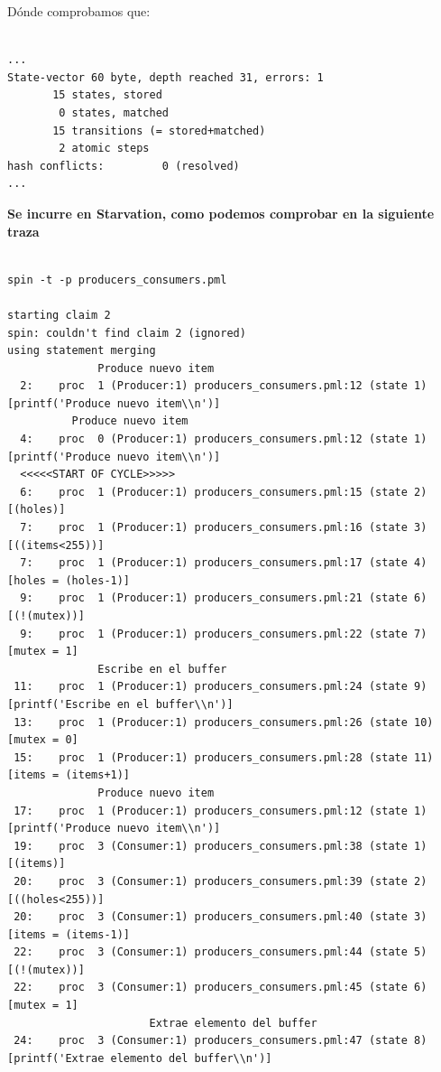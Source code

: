 \documentclass[a4paper,12pt]{article}
\begin{document}
Dónde comprobamos que:

\begin{lstlisting}[frame=single]  % Start your code-block

...
State-vector 60 byte, depth reached 31, errors: 1
       15 states, stored
        0 states, matched
       15 transitions (= stored+matched)
        2 atomic steps
hash conflicts:         0 (resolved)
...
\end{lstlisting}
\textbf{Se incurre en Starvation, como podemos comprobar en la siguiente traza}

\begin{lstlisting}[frame=single]  % Start your code-block

spin -t -p producers_consumers.pml

starting claim 2
spin: couldn't find claim 2 (ignored)
using statement merging
              Produce nuevo item
  2:	proc  1 (Producer:1) producers_consumers.pml:12 (state 1)	[printf('Produce nuevo item\\n')]
          Produce nuevo item
  4:	proc  0 (Producer:1) producers_consumers.pml:12 (state 1)	[printf('Produce nuevo item\\n')]
  <<<<<START OF CYCLE>>>>>
  6:	proc  1 (Producer:1) producers_consumers.pml:15 (state 2)	[(holes)]
  7:	proc  1 (Producer:1) producers_consumers.pml:16 (state 3)	[((items<255))]
  7:	proc  1 (Producer:1) producers_consumers.pml:17 (state 4)	[holes = (holes-1)]
  9:	proc  1 (Producer:1) producers_consumers.pml:21 (state 6)	[(!(mutex))]
  9:	proc  1 (Producer:1) producers_consumers.pml:22 (state 7)	[mutex = 1]
              Escribe en el buffer
 11:	proc  1 (Producer:1) producers_consumers.pml:24 (state 9)	[printf('Escribe en el buffer\\n')]
 13:	proc  1 (Producer:1) producers_consumers.pml:26 (state 10)	[mutex = 0]
 15:	proc  1 (Producer:1) producers_consumers.pml:28 (state 11)	[items = (items+1)]
              Produce nuevo item
 17:	proc  1 (Producer:1) producers_consumers.pml:12 (state 1)	[printf('Produce nuevo item\\n')]
 19:	proc  3 (Consumer:1) producers_consumers.pml:38 (state 1)	[(items)]
 20:	proc  3 (Consumer:1) producers_consumers.pml:39 (state 2)	[((holes<255))]
 20:	proc  3 (Consumer:1) producers_consumers.pml:40 (state 3)	[items = (items-1)]
 22:	proc  3 (Consumer:1) producers_consumers.pml:44 (state 5)	[(!(mutex))]
 22:	proc  3 (Consumer:1) producers_consumers.pml:45 (state 6)	[mutex = 1]
                      Extrae elemento del buffer
 24:	proc  3 (Consumer:1) producers_consumers.pml:47 (state 8)	[printf('Extrae elemento del buffer\\n')]

\end{lstlisting}
\end{document}
